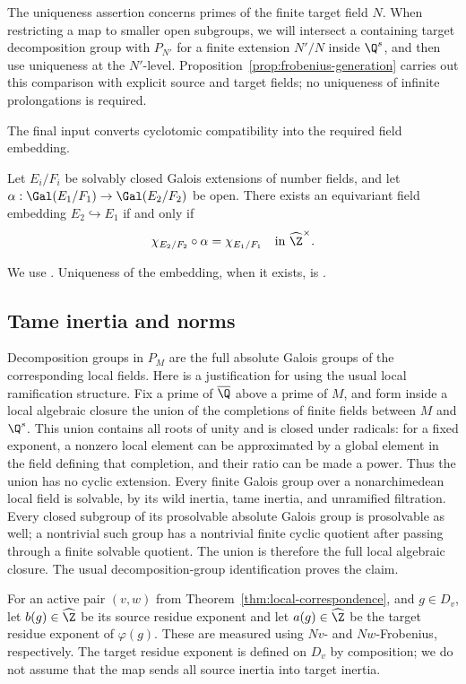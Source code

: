 The uniqueness assertion concerns primes of the finite target field $N$. When restricting a map to smaller open subgroups, we will intersect a containing target decomposition group with $P_{N'}$ for a finite extension $N'/N$ inside $\Q^s$, and then use uniqueness at the $N'$-level. Proposition~\ref{prop:frobenius-generation} carries out this comparison with explicit source and target fields; no uniqueness of infinite prolongations is required.

The final input converts cyclotomic compatibility into the required field embedding.
\begin{theorem}[Hoshi]\label{thm:hoshi}
Let $E_i/F_i$ be solvably closed Galois extensions of number fields, and let
$\alpha:\Gal(E_1/F_1)\to\Gal(E_2/F_2)$ be open. There exists an equivariant field embedding $E_2\hookrightarrow E_1$ if and only if
\[
 \chi_{E_2/F_2}\circ\alpha=\chi_{E_1/F_1}
 \quad\text{in }\widehat{\Z}^{\times}.
\]
\end{theorem}
We use \cite[Theorem~3.4]{hoshi2025}. Uniqueness of the embedding, when it exists, is \cite[Proposition~2]{uchida1981}.

\subsection{Tame inertia and norms}
Decomposition groups in $P_M$ are the full absolute Galois groups of the corresponding local fields. Here is a justification for using the usual local ramification structure. Fix a prime of $\overline{\Q}$ above a prime of $M$, and form inside a local algebraic closure the union of the completions of finite fields between $M$ and $\Q^s$. This union contains all roots of unity and is closed under radicals: for a fixed exponent, a nonzero local element can be approximated by a global element in the field defining that completion, and their ratio can be made a power. Thus the union has no cyclic extension. Every finite Galois group over a nonarchimedean local field is solvable, by its wild inertia, tame inertia, and unramified filtration. Every closed subgroup of its prosolvable absolute Galois group is prosolvable as well; a nontrivial such group has a nontrivial finite cyclic quotient after passing through a finite solvable quotient. The union is therefore the full local algebraic closure. The usual decomposition-group identification proves the claim.

For an active pair $(v,w)$ from Theorem~\ref{thm:local-correspondence}, and $g\in D_v$, let $b(g)\in\widehat{\Z}$ be its source residue exponent and let $a(g)\in\widehat{\Z}$ be the target residue exponent of $\varphi(g)$. These are measured using $Nv$- and $Nw$-Frobenius, respectively. The target residue exponent is defined on $D_v$ by composition; we do not assume that the map sends all source inertia into target inertia.

